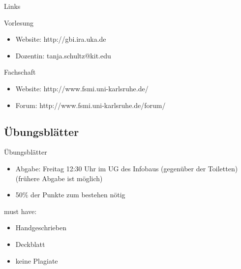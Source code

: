 \documentclass[18pt]{beamer}
\begin{document}
	\begin{frame}{Links}
		\begin{block}{Vorlesung}
			\begin{itemize}
				\item Website: http://gbi.ira.uka.de
				\item Dozentin: tanja.schultz@kit.edu
			\end{itemize}
		\end{block}

		\begin{block}{Fachschaft}
			\begin{itemize}
				\item Website: http://www.fsmi.uni-karlsruhe.de/
				\item Forum: http://www.fsmi.uni-karlsruhe.de/forum/
			\end{itemize}
		\end{block}
	\end{frame}


\subsection{\"Ubungsbl\"atter}
	\begin{frame}{\"Ubungsbl\"atter}
		\begin{itemize}
			\item Abgabe: Freitag 12:30 Uhr im UG des Infobaus (gegen\"uber der Toiletten) (fr\"uhere Abgabe ist m\"oglich)
			\item 50\% der Punkte zum bestehen n\"otig
		\end{itemize}

		\begin{exampleblock}{must have:}
			\begin{itemize}
				\item Handgeschrieben
				\item Deckblatt
				\item keine Plagiate
			\end{itemize}
		\end{exampleblock}
	\end{frame}
\end{document}
